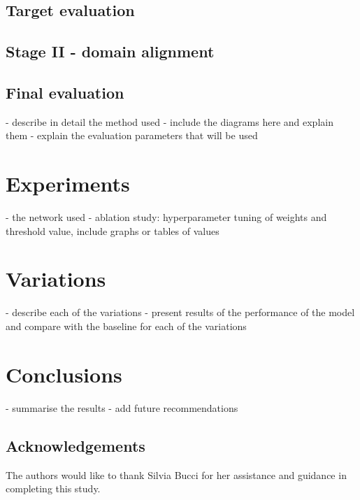\documentclass[10pt,twocolumn,letterpaper]{article}
\begin{document}
\subsection{Target evaluation}

\subsection{Stage II - domain alignment}

\subsection{Final evaluation}

- describe in detail the method used
- include the diagrams here and explain them
- explain the evaluation parameters that will be used

\section{Experiments}
\label{sec:experiments}

- the network used
- ablation study: hyperparameter tuning of weights and threshold value, include graphs or tables of values


\section{Variations}
\label{sec:variations}

- describe each of the variations
- present results of the performance of the model and compare with the baseline for each of the variations

\section{Conclusions}
\label{sec:conclusion}

- summarise the results
- add future recommendations

\subsection{Acknowledgements}
The authors would like to thank Silvia Bucci for her assistance and guidance in completing this study.


{\small


}
\end{document}
